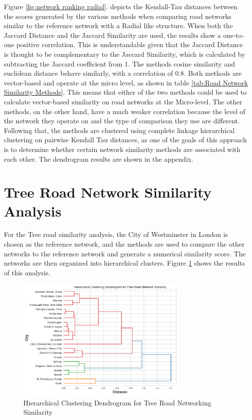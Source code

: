 Figure \ref{fig:network ranking radial}. depicts the Kendall-Tau distances between the scores generated by the various methods when comparing road networks similar to the reference network with a Radial like structure. When both the Jaccard Distance and the Jaccard Similarity are used, the results show a one-to-one positive correlation. This is understandable given that the Jaccard Distance is thought to be complementary to the Jaccard Similarity, which is calculated by subtracting the Jaccard coefficient from 1. The methods cosine similarity and euclidean distance behave similarly, with a correlation of 0.8. Both methods are vector-based and operate at the micro level, as shown in table \ref{tab:Road Network Similarity Methods}. This means that either of the two methods could be used to calculate vector-based similarity on road networks at the Micro-level. The other methods, on the other hand, have a much weaker correlation because the level of the network they operate on and the type of comparison they use are different.
Following that, the methods are clustered using complete linkage hierarchical clustering on pairwise Kendall Tau distances, as one of the goals of this approach is to determine whether certain network similarity methods are associated with each other. The dendrogram results are shown in the appendix.

\section{Tree Road Network Similarity Analysis}

For the Tree road similarity analysis, the City of Westminster in London is chosen as the reference network, and the methods are used to compare the other networks to the reference network and generate a numerical similarity score. The networks are then organized into hierarchical clusters. Figure \ref{fig:Hierarchical Clustering Dendrogram for Tree Road Networking Similarity} shows the results of this analysis.

\begin{figure}[!ht]
\centering
\includegraphics[width=0.75\textwidth,center]{picture/Tree/tree_dendrogram2.png}
\caption[Hierarchical Clustering Dendrogram for Tree Road Networking Similarity]{Hierarchical Clustering Dendrogram for Tree Road Networking Similarity}
\label{fig:Hierarchical Clustering Dendrogram for Tree Road Networking Similarity}
\end{figure}

